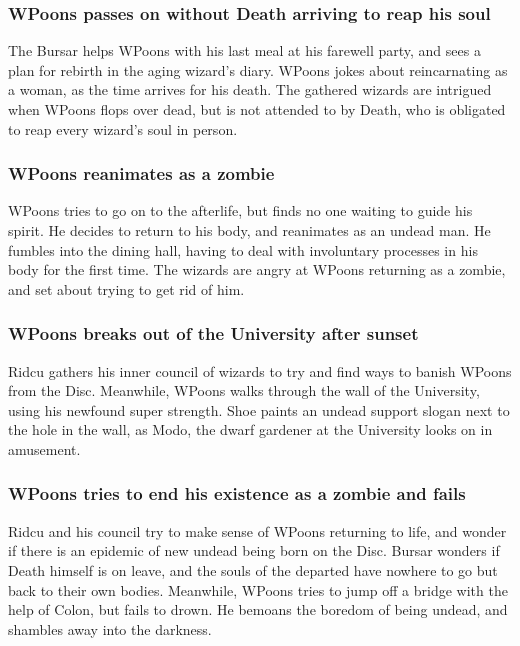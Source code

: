 \subsubsection{\Gls{WPoons} passes on without \Gls{Death} arriving to reap his soul}
The \Gls{Bursar} helps \Gls{WPoons} with his last meal at his farewell party, and sees a plan for
rebirth in the aging wizard's diary. \Gls{WPoons} jokes about reincarnating as a woman, as the
time arrives for his death. The gathered wizards are intrigued when \Gls{WPoons} flops over dead,
but is not attended to by \Gls{Death}, who is obligated to reap every wizard's soul in person.

\subsubsection{\Gls{WPoons} reanimates as a zombie}
\Gls{WPoons} tries to go on to the afterlife, but finds no one waiting to guide his spirit. He
decides to return to his body, and reanimates as an undead man. He fumbles into the dining hall,
having to deal with involuntary processes in his body for the first time. The wizards are angry at
\Gls{WPoons} returning as a zombie, and set about trying to get rid of him.

\subsubsection{\Gls{WPoons} breaks out of the University after sunset}
\Gls{Ridcu} gathers his inner council of wizards to try and find ways to banish \Gls{WPoons} from
the Disc. Meanwhile, \Gls{WPoons} walks through the wall of the University, using his newfound
super strength. \Gls{Shoe} paints an undead support slogan next to the hole in the wall, as
\Gls{Modo}, the dwarf gardener at the University looks on in amusement.

\subsubsection{\Gls{WPoons} tries to end his existence as a zombie and fails}
\Gls{Ridcu} and his council try to make sense of \Gls{WPoons} returning to life, and wonder if there
is an epidemic of new undead being born on the Disc. \Gls{Bursar} wonders if \Gls{Death} himself is
on leave, and the souls of the departed have nowhere to go but back to their own bodies. Meanwhile,
\Gls{WPoons} tries to jump off a bridge with the help of \Gls{Colon}, but fails to drown. He
bemoans the boredom of being undead, and shambles away into the darkness.

